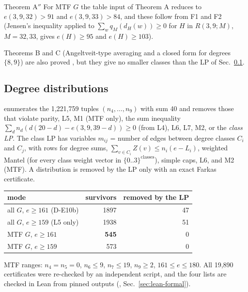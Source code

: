 \begin{namedthm}{Theorem A$''$}
For MTF $G$ the table input of Theorem A reduces to $e(3,9,32) > 91$ and $e(3,9,33) > 84$, and these
follow from F1 and F2 (Jensen's inequality applied to $\sum_w q_M(d_H(w)) \ge 0$ for $H$ in $R(3,9;M)$, $M = 32, 33$, gives
$e(H) \ge 95$ and $e(H) \ge 103$).
\end{namedthm}
Theorems B and C (Angeltveit-type averaging and a closed form for degrees $\{8,9\}$) are also proved
, but they give no smaller classes than the LP of Sec.~\ref{sec:dist}.

\subsection{Degree distributions}\label{sec:dist}
 enumerates the 1,221,759 tuples $(n_4, \dots, n_9)$ with sum 40 and removes those that violate
parity, L5, M1 (MTF only), the sum inequality $\sum_d n_d (d(20-d) - e(3,9,39-d)) \ge 0$ (from L4), L6, L7, M2, or the
\emph{class LP}. The class LP has variables $m_{ij}$ = number of edges between degree classes $C_i$ and $C_j$, with rows for
degree sums, $\sum_{v \in C_i} Z(v) \le n_i (e - L_i)$, weighted Mantel (for every class weight vector in $\{0..3\}^{\text{classes}}$),
simple caps, L6, and M2 (MTF). A distribution is removed by the LP only with an exact Farkas certificate.

\begin{center}\small
\begin{tabular}{@{}lrr@{}}
\toprule
mode & survivors & removed by the LP \\
\midrule
all $G$, $e \ge 161$ (D-E10b) & 1897 & 47 \\
all $G$, $e \ge 159$ (L5 only) & 1938 & 51 \\
MTF $G$, $e \ge 161$ & \textbf{545} & 0 \\
MTF $G$, $e \ge 159$ & 573 & 0 \\
\bottomrule
\end{tabular}
\end{center}

MTF ranges: $n_4 = n_5 = 0$, $n_6 \le 9$, $n_7 \le 19$, $n_9 \ge 2$, $161 \le e \le 180$. All 19,890 certificates were re-checked
by an independent script, and the four lists are checked in Lean from pinned outputs (, Sec.~\ref{sec:lean-formal}).

